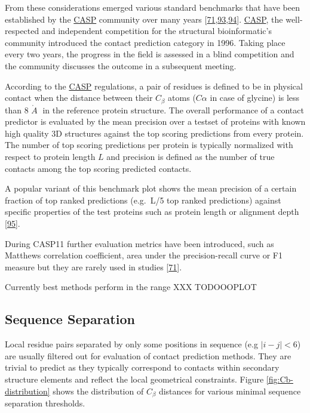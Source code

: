 \documentclass[12pt,a4paper,twoside]{book}
\newcommand{\Cb}{C_\beta}
\newcommand{\angstrom}{\mathring{A} \;}
\theoremstyle{definition}
\theoremstyle{definition}
\theoremstyle{remark}
\begin{document}
From these considerations emerged various standard benchmarks that have
been established by the \protect\hyperlink{abbrev}{CASP} community over
many years
{[}\protect\hyperlink{ref-Monastyrskyy2015}{71},\protect\hyperlink{ref-Monastyrskyy2011}{93},\protect\hyperlink{ref-Monastyrskyy2014a}{94}{]}.
\protect\hyperlink{abbrev}{CASP}, the well-respected and independent
competition for the structural bioinformatic's community introduced the
contact prediction category in 1996. Taking place every two years, the
progress in the field is assessed in a blind competition and the
community discusses the outcome in a subsequent meeting.

According to the \protect\hyperlink{abbrev}{CASP} regulations, a pair of
residues is defined to be in physical contact when the distance between
their \(\Cb\) atoms (\(C\alpha\) in case of glycine) is less than 8
\(\angstrom\) in the reference protein structure. The overall
performance of a contact predictor is evaluated by the mean precision
over a testset of proteins with known high quality 3D structures against
the top scoring predictions from every protein. The number of top
scoring predictions per protein is typically normalized with respect to
protein length \(L\) and precision is defined as the number of true
contacts among the top scoring predicted contacts.

A popular variant of this benchmark plot shows the mean precision of a
certain fraction of top ranked predictions (e.g.~L/5 top ranked
predictions) against specific properties of the test proteins such as
protein length or alignment depth
{[}\protect\hyperlink{ref-Ashkenazy2009}{95}{]}.

During CASP11 further evaluation metrics have been introduced, such as
Matthews correlation coefficient, area under the precision-recall curve
or F1 measure but they are rarely used in studies
{[}\protect\hyperlink{ref-Monastyrskyy2015}{71}{]}.

Currently best methods perform in the range XXX TODOOOPLOT

\subsection{Sequence Separation}\label{seq-sep}

Local residue pairs separated by only some positions in sequence (e.g
\(|i-j| < 6\)) are usually filtered out for evaluation of contact
prediction methods. They are trivial to predict as they typically
correspond to contacts within secondary structure elements and reflect
the local geometrical constraints. Figure \ref{fig:Cb-distribution}
shows the distribution of \(\Cb\) distances for various minimal sequence
separation thresholds.
\end{document}
